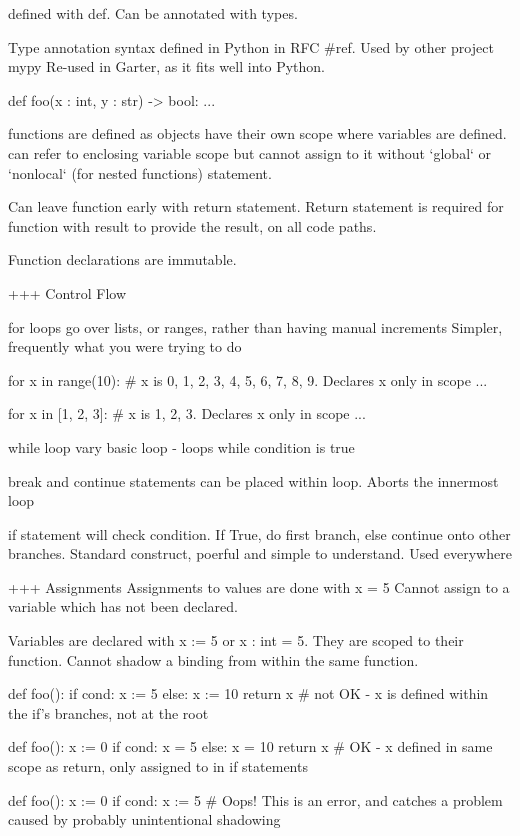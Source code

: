 defined with def. Can be annotated with types.

Type annotation syntax defined in Python in RFC #ref. Used by other project mypy
Re-used in Garter, as it fits well into Python.

def foo(x : int, y : str) -> bool:
    ...

functions are defined as objects
have their own scope where variables are defined. can refer to enclosing variable scope
but cannot assign to it without `global` or `nonlocal` (for nested functions) statement.

Can leave function early with return statement. Return statement is required for function
with result to provide the result, on all code paths.

Function declarations are immutable.

+++ Control Flow

for loops go over lists, or ranges, rather than having manual increments
Simpler, frequently what you were trying to do

for x in range(10): # x is 0, 1, 2, 3, 4, 5, 6, 7, 8, 9. Declares x only in scope
    ...

for x in [1, 2, 3]: # x is 1, 2, 3. Declares x only in scope
    ...

while loop vary basic loop - loops while condition is true

break and continue statements can be placed within loop. Aborts the innermost loop

if statement will check condition. If True, do first branch, else continue onto other branches.
Standard construct, poerful and simple to understand. Used everywhere

+++ Assignments
Assignments to values are done with x = 5
Cannot assign to a variable which has not been declared.

Variables are declared with x := 5 or x : int = 5. They are scoped to their function. Cannot shadow a binding from within the same function.

def foo():
    if cond:
        x := 5
    else:
        x := 10
    return x # not OK - x is defined within the if's branches, not at the root

def foo():
    x := 0
    if cond:
        x = 5
    else:
        x = 10
    return x # OK - x defined in same scope as return, only assigned to in if statements

def foo():
    x := 0
    if cond:
        x := 5 # Oops! This is an error, and catches a problem caused by probably unintentional shadowing


